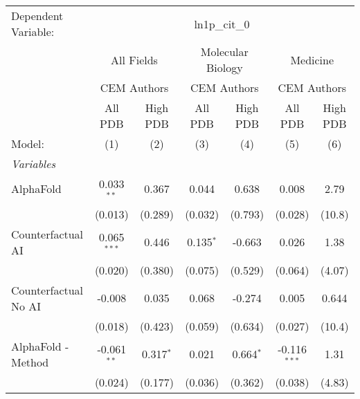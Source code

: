 \begingroup
\centering
\begin{tabular}{lcccccc}
   \tabularnewline \midrule \midrule
   Dependent Variable: & \multicolumn{6}{c}{ln1p\_cit\_0}\\
 & \multicolumn{2}{c}{All Fields} & \multicolumn{2}{c}{Molecular Biology} & \multicolumn{2}{c}{Medicine} \\
\cmidrule(lr){2-3} \cmidrule(lr){4-5} \cmidrule(lr){6-7}
 & \multicolumn{2}{c}{CEM Authors} & \multicolumn{2}{c}{CEM Authors} & \multicolumn{2}{c}{CEM Authors} \\
\cmidrule(lr){2-3} \cmidrule(lr){4-5} \cmidrule(lr){6-7}
 & \multicolumn{1}{c}{All PDB} & \multicolumn{1}{c}{High PDB} & \multicolumn{1}{c}{All PDB} & \multicolumn{1}{c}{High PDB} & \multicolumn{1}{c}{All PDB} & \multicolumn{1}{c}{High PDB} \\
\cmidrule(lr){2-2} \cmidrule(lr){3-3} \cmidrule(lr){4-4} \cmidrule(lr){5-5} \cmidrule(lr){6-6} \cmidrule(lr){7-7}
   Model:                                                     & (1)           & (2)           & (3)           & (4)         & (5)            & (6)\\  
   \midrule
   \emph{Variables}\\
   AlphaFold                                                  & 0.033$^{**}$  & 0.367         & 0.044         & 0.638       & 0.008          & 2.79\\   
                                                              & (0.013)       & (0.289)       & (0.032)       & (0.793)     & (0.028)        & (10.8)\\   
   Counterfactual AI                                          & 0.065$^{***}$ & 0.446         & 0.135$^{*}$   & -0.663      & 0.026          & 1.38\\   
                                                              & (0.020)       & (0.380)       & (0.075)       & (0.529)     & (0.064)        & (4.07)\\   
   Counterfactual No AI                                       & -0.008        & 0.035         & 0.068         & -0.274      & 0.005          & 0.644\\   
                                                              & (0.018)       & (0.423)       & (0.059)       & (0.634)     & (0.027)        & (10.4)\\   
   AlphaFold - Method                                         & -0.061$^{**}$ & 0.317$^{*}$   & 0.021         & 0.664$^{*}$ & -0.116$^{***}$ & 1.31\\   
                                                              & (0.024)       & (0.177)       & (0.036)       & (0.362)     & (0.038)        & (4.83)\\   

\end{tabular}
